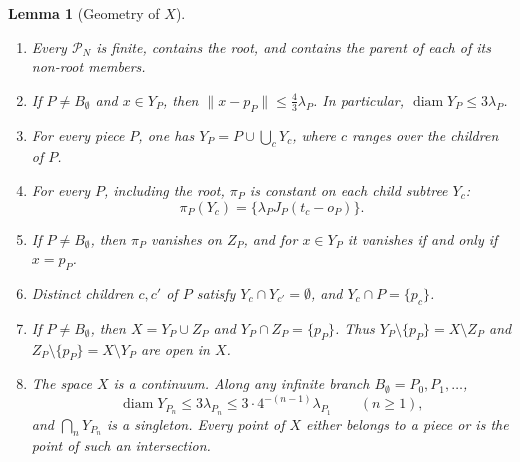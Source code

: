 \documentclass[11pt]{amsart}
\newtheorem{lemma}[theorem]{Lemma}
\theoremstyle{definition}
\theoremstyle{remark}
\newcommand{\diam}{\operatorname{diam}}
\newcommand{\Pc}{\mathcal{P}}
\begin{document}
\begin{lemma}[Geometry of $X$]\label{lem:geometry}
\begin{enumerate}[label=\textup{(\alph*)}]
\item Every $\Pc_N$ is finite, contains the root, and contains the parent of each of its non-root members.
\item If $P\neq B_\emptyset$ and $x\in Y_P$, then $\|x-p_P\|\le\frac43\lambda_P$. In particular, $\diam Y_P\le3\lambda_P$.
\item For every piece $P$, one has $Y_P=P\cup\bigcup_cY_c$, where $c$ ranges over the children of $P$.
\item For every $P$, including the root, $\pi_P$ is constant on each child subtree $Y_c$:
\[
\pi_P(Y_c)=\{\lambda_PJ_P(t_c-o_P)\}.
\]
\item If $P\neq B_\emptyset$, then $\pi_P$ vanishes on $Z_P$, and for $x\in Y_P$ it vanishes if and only if $x=p_P$.
\item Distinct children $c,c'$ of $P$ satisfy $Y_c\cap Y_{c'}=\emptyset$, and $Y_c\cap P=\{p_c\}$.
\item If $P\neq B_\emptyset$, then $X=Y_P\cup Z_P$ and $Y_P\cap Z_P=\{p_P\}$. Thus $Y_P\setminus\{p_P\}=X\setminus Z_P$ and $Z_P\setminus\{p_P\}=X\setminus Y_P$ are open in $X$.
\item The space $X$ is a continuum. Along any infinite branch $B_\emptyset=P_0,P_1,\ldots$,
\[
\diam Y_{P_n}\le3\lambda_{P_n}\le3\cdot4^{-(n-1)}\lambda_{P_1}\qquad(n\ge1),
\]
and $\bigcap_nY_{P_n}$ is a singleton. Every point of $X$ either belongs to a piece or is the point of such an intersection.
\end{enumerate}
\end{lemma}
\end{document}
